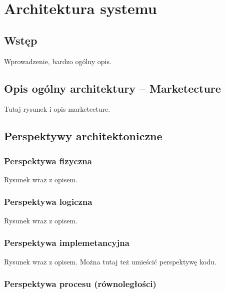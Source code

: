 \chapter{Architektura systemu}
\label{Chapter5}

\section{Wstęp}
\label{Chapter51}

{\color{red}Wprowadzenie, bardzo ogólny opis.}

\section{Opis ogólny architektury -- Marketecture}
\label{Chapter52}

{\color{red}Tutaj rysunek i opis marketecture.}

%
%
\section{Perspektywy architektoniczne}
\label{Chapter54}

\subsection{Perspektywa fizyczna}

{\color{red}Rysunek wraz z opisem.}

\subsection{Perspektywa logiczna}

{\color{red}Rysunek wraz z opisem.}

\subsection{Perspektywa implemetancyjna}

{\color{red}Rysunek wraz z opisem. Można tutaj też umieścić perspektywę kodu.}

\subsection{Perspektywa procesu (równoległości)}

